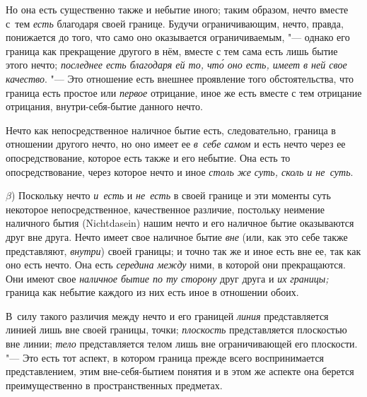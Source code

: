Но она есть существенно также и небытие иного; таким образом, нечто вместе
с~тем {\em есть} благодаря своей границе. Будучи ограничивающим, нечто, правда,
понижается до того, что само оно оказывается ограничиваемым, "--- однако его
граница как прекращение другого в нём, вместе с тем сама есть лишь бытие этого
нечто; {\em последнее есть благодаря ей то, чт\'{о} оно есть, имеет в ней свое
качество}. "--- Это отношение есть внешнее проявление того обстоятельства, что
граница есть простое или {\em первое} отрицание, иное же есть вместе с тем
отрицание отрицания, внутри-себя-бытие данного нечто.

Нечто как непосредственное наличное бытие есть, следовательно, граница
в отношении другого нечто, но оно имеет ее {\em в~себе самом} и есть нечто
через ее опосредствование, которое есть также и его небытие. Она есть то
опосредствование, через которое нечто и иное
{\em столь же суть, сколь и не~суть}.

$\beta$) Поскольку нечто {\em и~есть} и {\em не~есть} в своей
границе и эти моменты суть некоторое непосредственное, качественное различие,
постольку неимение наличного бытия (Nicht\-dasein) нашим нечто и его наличное
бытие оказываются друг вне друга. Нечто имеет свое наличное бытие {\em вне}
(или, как это себе также представляют, {\em внутри}) своей границы; и точно так
же и иное есть вне ее, так как оно есть нечто. Она есть {\em середина между}
ними, в которой они прекращаются. Они имеют свое {\em наличное бытие по ту
сторону} друг друга и {\em их границы;} граница как небытие каждого из них есть
иное в отношении обоих.

В~силу такого различия между нечто и его границей {\em линия} представляется
линией лишь вне своей границы, точки; {\em плоскость} представляется плоскостью
вне линии; {\em тело} представляется телом лишь вне ограничивающей его
плоскости. "--- Это есть тот аспект, в котором граница прежде всего
воспринимается представлением, этим вне-себя-бытием понятия и в этом же аспекте
она берется преимущественно в пространственных предметах.

